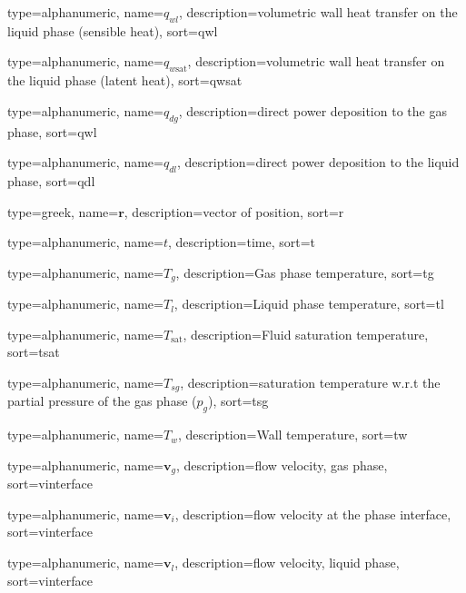 {
  type=alphanumeric,
	name={\ensuremath{q_{wl}}},
	description={volumetric wall heat transfer on the liquid phase (sensible heat)},
	sort={qwl}
}

{
  type=alphanumeric,
	name={\ensuremath{q_{w\text{sat}}}},
	description={volumetric wall heat transfer on the liquid phase (latent heat)},
	sort={qwsat}
}

{
  type=alphanumeric,
	name={\ensuremath{q_{dg}}},
	description={direct power deposition to the gas phase},
	sort={qwl}
}

{
  type=alphanumeric,
	name={\ensuremath{q_{dl}}},
	description={direct power deposition to the liquid phase},
	sort={qdl}
}

{
  type=greek,
	name={\ensuremath{\mathbf{r}}},
	description={vector of position},
	sort={r}
}

{
  type=alphanumeric,
	name={\ensuremath{t}},
	description={time},
	sort={t}
}

{
  type=alphanumeric,
	name={\ensuremath{T_{g}}},
	description={Gas phase temperature},
	sort={tg}
}

{
  type=alphanumeric,
	name={\ensuremath{T_{l}}},
	description={Liquid phase temperature},
	sort={tl}
}

{
  type=alphanumeric,
	name={\ensuremath{T_{\text{sat}}}},
	description={Fluid saturation temperature},
	sort={tsat}
}

{
  type=alphanumeric,
	name={\ensuremath{T_{sg}}},
	description={saturation temperature w.r.t the partial pressure of the gas phase ($p_g$)},
	sort={tsg}
}

{
  type=alphanumeric,
	name={\ensuremath{T_{w}}},
	description={Wall temperature},
	sort={tw}
}

{
  type=alphanumeric,
	name={\ensuremath{\mathbf{v}_g}},
	description={flow velocity, gas phase},
	sort={vinterface}
}	

{
  type=alphanumeric,
	name={\ensuremath{\mathbf{v}_i}},
	description={flow velocity at the phase interface},
	sort={vinterface}
}	

{
  type=alphanumeric,
	name={\ensuremath{\mathbf{v}_l}},
	description={flow velocity, liquid phase},
	sort={vinterface}
}	


